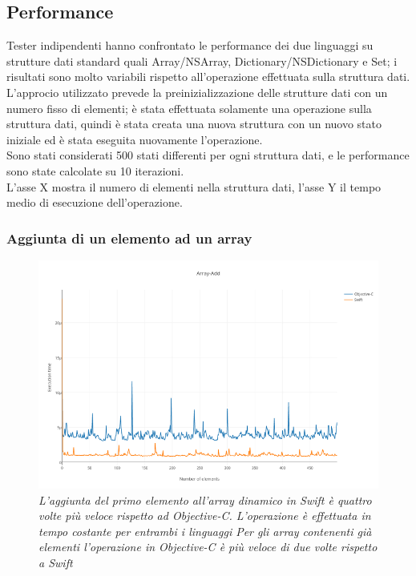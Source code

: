 \subsection{Performance}
Tester indipendenti hanno confrontato le performance dei due linguaggi su strutture dati standard quali Array/NSArray, Dictionary/NSDictionary e Set; i risultati sono molto variabili rispetto all'operazione effettuata sulla struttura dati.\\
L'approcio utilizzato prevede la preinizializzazione delle strutture dati con un numero fisso di elementi; è stata effettuata solamente una operazione sulla struttura dati, quindi è stata creata una nuova struttura con un nuovo stato iniziale ed è stata eseguita nuovamente l'operazione.\\ Sono stati considerati 500 stati differenti per ogni struttura dati, e le performance sono state calcolate su 10 iterazioni.\\L'asse X mostra il numero di elementi nella struttura dati, l'asse Y il tempo medio di esecuzione dell'operazione.
\subsubsection{Aggiunta di un elemento ad un array}
\begin{figure}[H]
      \centering
      \includegraphics[scale=0.50]{immagini/array_add.png}
            \vspace{0.8cm}
            \caption{\textit{L'aggiunta del primo elemento all'array dinamico in Swift è quattro volte più veloce rispetto ad Objective-C.
L'operazione è effettuata in tempo costante per entrambi i linguaggi
Per gli array contenenti già elementi l'operazione in Objective-C è più veloce di due volte rispetto a Swift}}
\end{figure}
